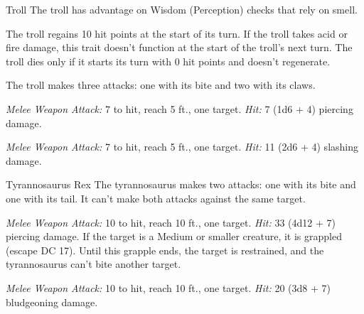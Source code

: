 \documentclass[10pt,a4paper,twoside,bg=print,twocolumn,openany,nodeprecatedcode]{dndbook}
\begin{document}
\clearpage

\begin{DndMonster}[float=t]{Troll}
\DndMonsterBasics[
armor-class = {15 (natural armor)},
hit-points = {\DndDice{8d10 + 40}},
speed = {30 ft.}
]
\DndMonsterAbilityScores[
 str = 18,
 dex = 13,
 con = 20,
 int = 7,
 wis = 9,
 cha = 7
]
\DndMonsterDetails[
skills = {Perception +2},
senses = {darkvision 60 ft., passive perception 12},
languages = {Giant},
challenge = 5,
]
The troll has advantage on Wisdom (Perception) checks that rely on smell.

The troll regains 10 hit points at the start of its turn. If the troll takes acid or fire damage, this trait doesn't function at the start of the troll's next turn. The troll dies only if it starts its turn with 0 hit points and doesn't regenerate.

The troll makes three attacks: one with its bite and two with its claws.

\textsl{Melee Weapon Attack:} 7 to hit, reach 5 ft., one target. \textsl{Hit:} 7 (1d6 + 4) piercing damage.

\textsl{Melee Weapon Attack:} 7 to hit, reach 5 ft., one target. \textsl{Hit:} 11 (2d6 + 4) slashing damage.

\end{DndMonster}



\begin{DndMonster}[float=t]{Tyrannosaurus Rex}
\DndMonsterBasics[
armor-class = {13 (natural armor)},
hit-points = {\DndDice{13d12 + 52}},
speed = {50 ft.}
]
\DndMonsterAbilityScores[
 str = 25,
 dex = 10,
 con = 19,
 int = 2,
 wis = 12,
 cha = 9
]
\DndMonsterDetails[
skills = {Perception +4},
challenge = 8,
]
The tyrannosaurus makes two attacks: one with its bite and one with its tail. It can't make both attacks against the same target.

\textsl{Melee Weapon Attack:} 10 to hit, reach 10 ft., one target. \textsl{Hit:} 33 (4d12 + 7) piercing damage. If the target is a Medium or smaller creature, it is grappled (escape DC 17). Until this grapple ends, the target is restrained, and the tyrannosaurus can't bite another target.

\textsl{Melee Weapon Attack:} 10 to hit, reach 10 ft., one target. \textsl{Hit:} 20 (3d8 + 7) bludgeoning damage.

\end{DndMonster}
\end{document}
